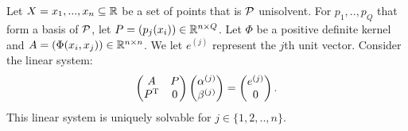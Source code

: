 \documentclass[twoside]{memoir}
\begin{document}
	Let $X = {x_1, ..., x_n} \subseteq \mathbb{R}$  be a set of points that is $\mathcal{P}$ unisolvent. For $p_1, .., p_Q$ that form a basis of $\mathcal{P}$, let $P = (p_j(x_i)) \in \mathbb{R}^{n\times Q}$. Let $\Phi$ be a positive definite kernel and $A = (\Phi(x_i, x_j)) \in \mathbb{R}^{n\times n}$. We let $e^{(j)}$ represent the $j$th unit vector.
	Consider the linear system:
	\begin{equation} \label{eqn:InterpolateMat}
	\begin{pmatrix}
	A & P \\
	P^{\text{T}} & 0 \\
	\end{pmatrix}
	\begin{pmatrix}
	\alpha^{(j)} \\ \beta^{(j)}
	\end{pmatrix}
	=
	\begin{pmatrix}
	e^{(j)} \\ 0
	\end{pmatrix}.
	\end{equation}
	This linear system is uniquely solvable for $j \in \{1, 2, .., n\}$.
	
\end{document}

